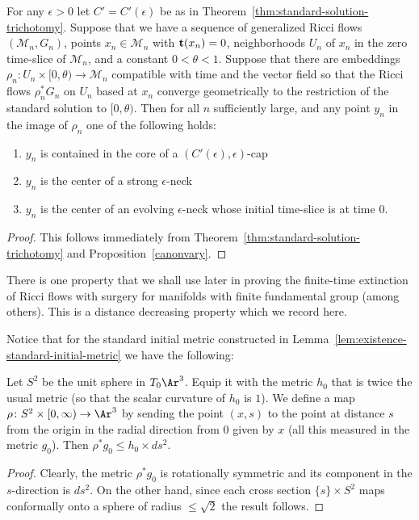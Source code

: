 \begin{corollary}
\label{cor:generalized-flow-limit-trichotomy}
\label{stdsolnlimit}
For any $\epsilon>0$ let $C'=C'(\epsilon)$ be as in
Theorem~\ref{thm:standard-solution-trichotomy}. Suppose that we have a sequence of
generalized Ricci flows $({\mathcal M}_n,G_n)$, points $x_n\in
{\mathcal M}_n$ with ${\bf t}(x_n)=0$, neighborhoods $U_n$ of $x_n$
in the zero time-slice of ${\mathcal M}_n$, and a constant
$0<\theta<1$. Suppose that there are embeddings $\rho_n\colon
U_n\times [0,\theta)\to {\mathcal M}_n$ compatible with time and the
vector field so that the Ricci flows $\rho_n^*G_n$ on $U_n$ based at
$x_n$ converge geometrically to the restriction of the standard
solution to $[0,\theta)$. Then for all $n$ sufficiently large, and
any point $y_n$ in the image of $\rho_n$ one of the following holds:
\begin{enumerate}
\item[(1)] $y_n$ is contained in the core of a
$(C'(\epsilon),\epsilon)$-cap
\item[(2)] $y_n$ is the center of a strong $\epsilon$-neck
\item[(3)] $y_n$ is the center of an evolving $\epsilon$-neck whose
initial time-slice is at time $0$.
\end{enumerate}
\end{corollary}

\begin{proof}
This follows immediately from Theorem~\ref{thm:standard-solution-trichotomy} and
Proposition~\ref{canonvary}.
\end{proof}



There is one property that we shall use later in proving the
finite-time extinction of Ricci flows with surgery for manifolds
with finite fundamental group (among others). This is a distance
decreasing property which we record here.

Notice that for the standard initial metric constructed in
Lemma~\ref{lem:existence-standard-initial-metric} we have the following:

\begin{lemma}
\label{lem:standard-initial-metric-distance-decreasing}
\label{decrease}
Let $S^2$ be the unit sphere in $T_0\Ar^3$. Equip it with the metric
$h_0$ that is twice the usual metric (so that the scalar curvature
of $h_0$ is $1$). We define a map $\rho\colon S^2\times
[0,\infty)\to \Ar^3$ by sending the point $(x,s)$ to the point at
distance $s$ from the origin in the radial direction from $0$ given
by $x$ (all this measured in the metric $g_0$). Then $\rho^*g_0\le
h_0\times ds^2$.
\end{lemma}


\begin{proof}
Clearly, the metric $\rho^*g_0$ is rotationally symmetric and its
component in the $s$-direction is $ds^2$. On the other hand, since
each cross section $\{s\}\times S^2$ maps conformally onto a sphere
of radius $\le\sqrt{2}$ the result follows.
\end{proof}
